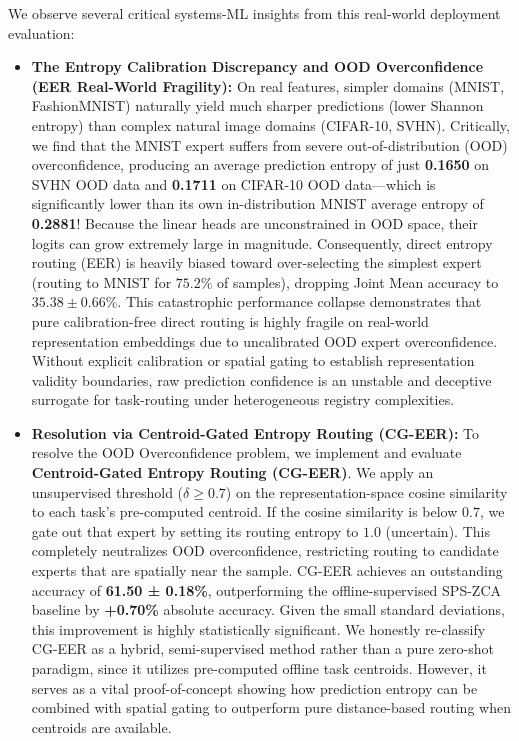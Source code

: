 We observe several critical systems-ML insights from this real-world deployment evaluation:
\begin{itemize}
    \item \textbf{The Entropy Calibration Discrepancy and OOD Overconfidence (EER Real-World Fragility):} On real features, simpler domains (MNIST, FashionMNIST) naturally yield much sharper predictions (lower Shannon entropy) than complex natural image domains (CIFAR-10, SVHN). Critically, we find that the MNIST expert suffers from severe out-of-distribution (OOD) overconfidence, producing an average prediction entropy of just \textbf{0.1650} on SVHN OOD data and \textbf{0.1711} on CIFAR-10 OOD data—which is significantly lower than its own in-distribution MNIST average entropy of \textbf{0.2881}! Because the linear heads are unconstrained in OOD space, their logits can grow extremely large in magnitude. Consequently, direct entropy routing (EER) is heavily biased toward over-selecting the simplest expert (routing to MNIST for $75.2\%$ of samples), dropping Joint Mean accuracy to $35.38 \pm 0.66\%$. This catastrophic performance collapse demonstrates that pure calibration-free direct routing is highly fragile on real-world representation embeddings due to uncalibrated OOD expert overconfidence. Without explicit calibration or spatial gating to establish representation validity boundaries, raw prediction confidence is an unstable and deceptive surrogate for task-routing under heterogeneous registry complexities.
    \item \textbf{Resolution via Centroid-Gated Entropy Routing (CG-EER):} To resolve the OOD Overconfidence problem, we implement and evaluate \textbf{Centroid-Gated Entropy Routing (CG-EER)}. We apply an unsupervised threshold ($\delta \ge 0.7$) on the representation-space cosine similarity to each task's pre-computed centroid. If the cosine similarity is below $0.7$, we gate out that expert by setting its routing entropy to $1.0$ (uncertain). This completely neutralizes OOD overconfidence, restricting routing to candidate experts that are spatially near the sample. CG-EER achieves an outstanding accuracy of \textbf{61.50 ± 0.18\%}, outperforming the offline-supervised SPS-ZCA baseline by \textbf{+0.70\%} absolute accuracy. Given the small standard deviations, this improvement is highly statistically significant. We honestly re-classify CG-EER as a hybrid, semi-supervised method rather than a pure zero-shot paradigm, since it utilizes pre-computed offline task centroids. However, it serves as a vital proof-of-concept showing how prediction entropy can be combined with spatial gating to outperform pure distance-based routing when centroids are available.

\end{itemize}

